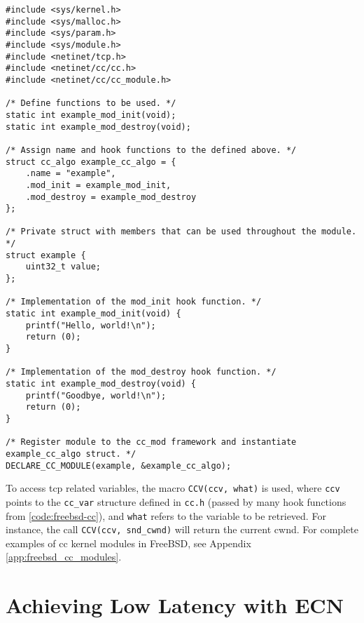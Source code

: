 \begin{code}
\begin{verbatim}
#include <sys/kernel.h>
#include <sys/malloc.h>
#include <sys/param.h>
#include <sys/module.h>
#include <netinet/tcp.h>
#include <netinet/cc/cc.h>
#include <netinet/cc/cc_module.h>

/* Define functions to be used. */
static int example_mod_init(void);
static int example_mod_destroy(void);

/* Assign name and hook functions to the defined above. */
struct cc_algo example_cc_algo = {
    .name = "example",
    .mod_init = example_mod_init,
    .mod_destroy = example_mod_destroy
};

/* Private struct with members that can be used throughout the module. */
struct example {
	uint32_t value;
};

/* Implementation of the mod_init hook function. */
static int example_mod_init(void) {
	printf("Hello, world!\n");
	return (0);
}

/* Implementation of the mod_destroy hook function. */
static int example_mod_destroy(void) {
	printf("Goodbye, world!\n");
	return (0);
}

/* Register module to the cc_mod framework and instantiate example_cc_algo struct. */
DECLARE_CC_MODULE(example, &example_cc_algo);
\end{verbatim}
\label{code:freebsd-cc}
\end{code}

To access \gls{tcp} related variables, the macro \lstinline{CCV(ccv, what)} is used, where \lstinline{ccv} points to the \lstinline{cc_var} structure defined in \lstinline{cc.h} (passed by many hook functions from \ref{code:freebsd-cc}), and \lstinline{what} refers to the variable to be retrieved. For instance, the call \lstinline{CCV(ccv, snd_cwnd)} will return the current \gls{cwnd}. For complete examples of \gls{cc} kernel modules in FreeBSD, see Appendix \ref{app:freebsd_cc_modules}.









\section{Achieving Low Latency with ECN}

